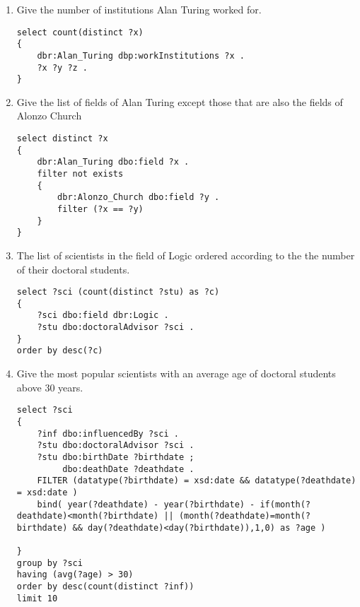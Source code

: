 \documentclass[a4paper, 12pt]{report}
\begin{document}
\begin{enumerate}
\begin{lstlisting}[frame=single]
\end{lstlisting}

\item Give the number of institutions Alan Turing worked for.
\begin{lstlisting}[frame=single]
select count(distinct ?x)
{
    dbr:Alan_Turing dbp:workInstitutions ?x .
    ?x ?y ?z .
}
\end{lstlisting}

\item Give the list of fields of Alan Turing except those that are also the fields of Alonzo Church
\begin{lstlisting}[frame=single]
select distinct ?x
{
    dbr:Alan_Turing dbo:field ?x .
    filter not exists 
    {
        dbr:Alonzo_Church dbo:field ?y .
        filter (?x == ?y)
    }
}
\end{lstlisting}

\item The list of scientists in the field of Logic ordered according to the the number of their doctoral students.
\begin{lstlisting}[frame=single]
select ?sci (count(distinct ?stu) as ?c)
{
    ?sci dbo:field dbr:Logic .
    ?stu dbo:doctoralAdvisor ?sci .
}
order by desc(?c) 
\end{lstlisting}

\item Give the most popular scientists with an average age of doctoral students above 30 years.
\begin{lstlisting}[frame=single]
select ?sci 
{
    ?inf dbo:influencedBy ?sci .
    ?stu dbo:doctoralAdvisor ?sci .
    ?stu dbo:birthDate ?birthdate ;
         dbo:deathDate ?deathdate .
    FILTER (datatype(?birthdate) = xsd:date && datatype(?deathdate) = xsd:date )
    bind( year(?deathdate) - year(?birthdate) - if(month(?deathdate)<month(?birthdate) || (month(?deathdate)=month(?birthdate) && day(?deathdate)<day(?birthdate)),1,0) as ?age )

}
group by ?sci
having (avg(?age) > 30)
order by desc(count(distinct ?inf))
limit 10
\end{lstlisting}
\end{enumerate}
\end{document}
